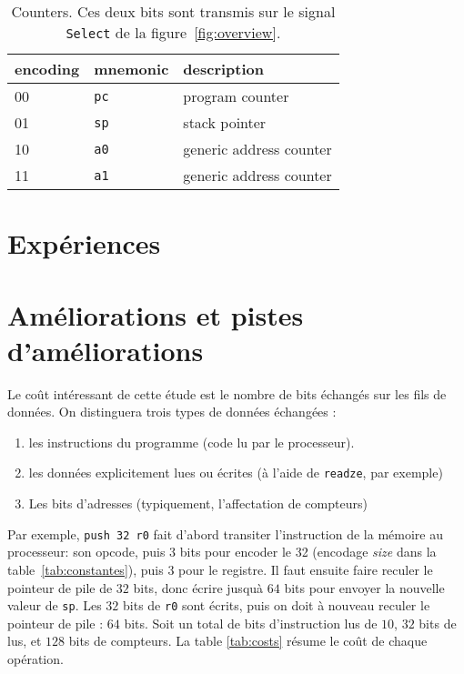 \documentclass[architecture]{compas2018}
\begin{document}
\begin{table} 
  \caption{Counters. Ces deux bits sont transmis sur le signal \texttt{Select} de la figure~\ref{fig:overview}. }
  \label{tab:counters}
\begin{center}
  \begin{tabular}{|l|l|l|}
    \hline  
  encoding  & mnemonic & description \\
    \hline  
    \hline  
    00& \texttt{pc} &  program counter\\
    \hline
    01& \texttt{sp} & stack pointer\\
    \hline
    10& \texttt{a0} &  generic address counter\\
    \hline
    11& \texttt{a1} &  generic address counter\\
    \hline
  \end{tabular}
\end{center}
\end{table}


\section{Expériences}

\section{Améliorations et pistes d'améliorations}

Le coût intéressant de cette étude est le nombre de bits échangés sur les fils de données. On distinguera trois types de données échangées : 
\begin{enumerate}
\item les instructions du programme (code lu par le processeur).
\item les données explicitement lues ou écrites (à l'aide de \texttt{readze}, par exemple)
\item Les bits d'adresses (typiquement, l'affectation de compteurs)
\end{enumerate}

Par exemple, \texttt{push 32 r0} fait d'abord transiter l'instruction de la mémoire au processeur: son opcode, puis  $3$ bits  pour encoder le 32 (encodage \emph{size} dans la table~\ref{tab:constantes}), puis $3$ pour le registre.
Il faut ensuite faire reculer le pointeur de pile de $32$ bits, donc écrire jusquà $64$ bits pour envoyer la nouvelle valeur de \texttt{sp}.
Les $32$ bits de \texttt{r0} sont écrits, puis on doit à nouveau  reculer le pointeur de pile : $64$ bits. Soit un total de bits d'instruction lus de $10$, $32$ bits de lus, et $128$ bits de compteurs.
La table \ref{tab:costs} résume le coût de chaque opération.
\end{document}
